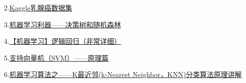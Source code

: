 \documentclass{ctexart}
\begin{document}
2.\href{https://www.kaggle.com/datasets/uciml/breast-cancer-wisconsin-data}{Kaggle乳腺癌数据集}

3.\href{https://zhuanlan.zhihu.com/p/30504716}{机器学习利器——决策树和随机森林}

4.\href{https://zhuanlan.zhihu.com/p/74874291}{【机器学习】逻辑回归（非常详细）}

5.\href{https://www.zhihu.com/tardis/zm/art/31886934?source_id=1003}{支持向量机（SVM）——原理篇}

6.\href{https://zhuanlan.zhihu.com/p/110913279}{机器学习算法之——K最近邻(k-Nearest Neighbor，KNN)分类算法原理讲解}
\end{document}
